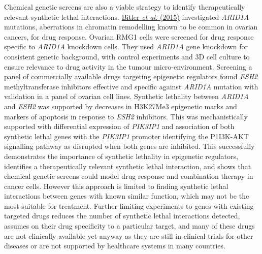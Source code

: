 Chemical genetic screens are also a viable strategy to identify therapeutically relevant synthetic lethal interactions. \hyperlink{ENREF13}{Bitler}\hyperlink{ENREF13}{\textit{ et al.}}\hyperlink{ENREF13}{ (2015)} investigated \textit{ARID1A} mutations, aberrations in chromatin remodelling known to be common in ovarian cancers, for drug response. Ovarian RMG1 cells were screened for drug response specific to \textit{ARID1A} knockdown cells. They used \textit{ARID1A} gene knockdown for consistent genetic background, with control experiments and 3D cell culture to ensure relevance to drug activity in the tumour micro-environment. Screening a panel of commercially available drugs targeting epigenetic regulators found \textit{ESH2} methyltransferase inhibitors effective and specific against \textit{ARID1A} mutation with validation in a panel of ovarian cell lines. Synthetic lethality between \textit{ARID1A} and \textit{ESH2} was supported by decreases in H3K27Me3 epigenetic marks and markers of apoptosis in response to \textit{ESH2} inhibitors. This was mechanistically supported with differential expression of \textit{PIK3IP1} and association of both synthetic lethal genes with the \textit{PIK3IP1} promoter identifying the P1I3K-AKT signalling pathway as disrupted when both genes are inhibited. This successfully demonstrates the importance of synthetic lethality in epigenetic regulators, identifies a therapeutically relevant synthetic lethal interaction, and shows that chemical genetic screens could model drug response and combination therapy in cancer cells. However this approach is limited to finding synthetic lethal interactions between genes with known similar function, which may not be the most suitable for treatment. Further limiting experiments to genes with existing targeted drugs reduces the number of synthetic lethal interactions detected, assumes on their drug specificity to a particular target, and many of these drugs are not clinically available yet anyway as they are still in clinical trials for other diseases or are not supported by healthcare systems in many countries.  

